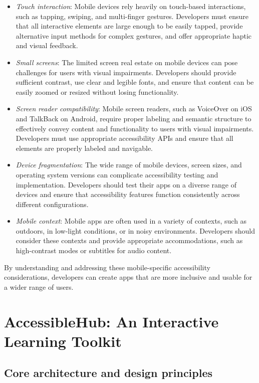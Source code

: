 \begin{itemize}
    \item \textit{Touch interaction}: Mobile devices rely heavily on touch-based interactions, such as tapping, swiping, and multi-finger gestures. Developers must ensure that all interactive elements are large enough to be easily tapped, provide alternative input methods for complex gestures, and offer appropriate haptic and visual feedback.
    \item \textit{Small screens}: The limited screen real estate on mobile devices can pose challenges for users with visual impairments. Developers should provide sufficient contrast, use clear and legible fonts, and ensure that content can be easily zoomed or resized without losing functionality.
    \item \textit{Screen reader compatibility}: Mobile screen readers, such as VoiceOver on iOS and TalkBack on Android, require proper labeling and semantic structure to effectively convey content and functionality to users with visual impairments. Developers must use appropriate accessibility APIs and ensure that all elements are properly labeled and navigable.
    \item \textit{Device fragmentation}: The wide range of mobile devices, screen sizes, and operating system versions can complicate accessibility testing and implementation. Developers should test their apps on a diverse range of devices and ensure that accessibility features function consistently across different configurations.
    \item \textit{Mobile context}: Mobile apps are often used in a variety of contexts, such as outdoors, in low-light conditions, or in noisy environments. Developers should consider these contexts and provide appropriate accommodations, such as high-contrast modes or subtitles for audio content.
\end{itemize}

By understanding and addressing these mobile-specific accessibility considerations, developers can create apps that are more inclusive and usable for a wider range of users.

\section{AccessibleHub: An Interactive Learning Toolkit}
\label{sec:accessiblehub}

\subsection{Core architecture and design principles}

